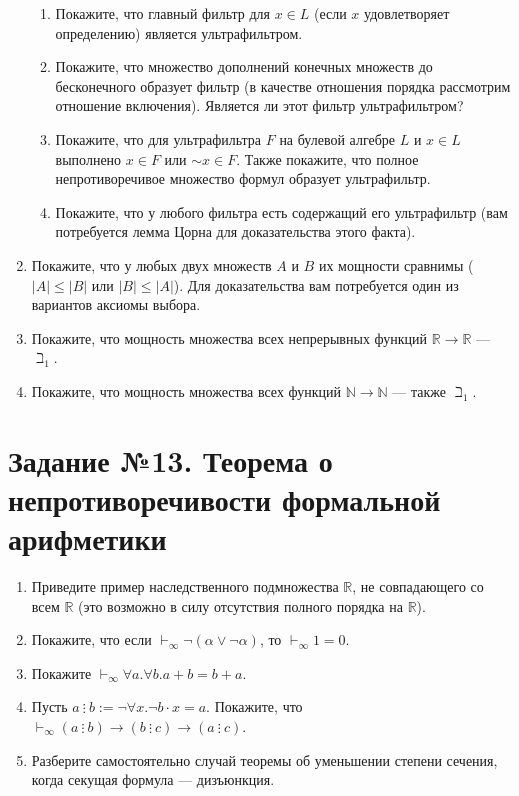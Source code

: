 \documentclass[10pt,a4paper,oneside]{article}
\begin{document}
\begin{enumerate}
\begin{enumerate}
\item Покажите, что главный фильтр для $x \in L$ (если $x$ удовлетворяет определению) является ультрафильтром.
\item Покажите, что множество дополнений конечных множеств до бесконечного образует фильтр (в качестве отношения порядка рассмотрим
отношение включения). Является ли этот фильтр ультрафильтром?
\item Покажите, что для ультрафильтра $F$ на булевой алгебре $L$ и $x \in L$ выполнено $x \in F$ или $\sim x \in F$. Также покажите,
что полное непротиворечивое множество формул образует ультрафильтр.
\item Покажите, что у любого фильтра есть содержащий его ультрафильтр (вам потребуется лемма Цорна для доказательства этого факта).
\end{enumerate}
\item Покажите, что у любых двух множеств $A$ и $B$ их мощности сравнимы ($|A| \le |B|$ или $|B| \le |A|$).
Для доказательства вам потребуется один из вариантов аксиомы выбора.
\item Покажите, что мощность множества всех непрерывных функций $\mathbb{R}\rightarrow\mathbb{R}$ --- $\beth_1$.
\item Покажите, что мощность множества всех функций $\mathbb{N}\rightarrow\mathbb{N}$ --- также $\beth_1$.

\end{enumerate}

\section*{Задание №13. Теорема о непротиворечивости формальной арифметики}
\begin{enumerate}
\item Приведите пример наследственного подмножества $\mathbb{R}$, не совпадающего со всем $\mathbb{R}$ (это возможно в силу
отсутствия полного порядка на $\mathbb{R}$).
\item Покажите, что если $\vdash_\infty\neg(\alpha\vee\neg\alpha)$, то $\vdash_\infty 1=0$.
\item Покажите $\vdash_\infty\forall a.\forall b.a + b = b + a$.
\item Пусть $a\ \vdots\ b := \neg\forall x.\neg b \cdot x = a$. Покажите, что $\vdash_\infty (a\ \vdots\ b)\rightarrow (b\ \vdots\ c) \rightarrow (a\ \vdots\ c)$.
\item Разберите самостоятельно случай теоремы об уменьшении степени сечения, когда секущая формула --- дизъюнкция.
\end{enumerate}
\end{document}
